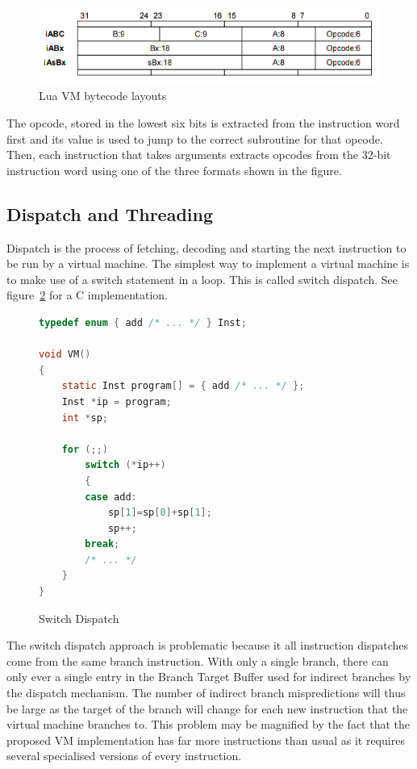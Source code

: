 \documentclass[english,a4paper,12pt]{report}
\begin{document}
\begin{figure}[!htb]
	\begin{center}
	    \includegraphics[scale=0.5]{luabytecode.png}
	\end{center}
 
  \caption[Lua VM bytecode layouts]{Lua VM bytecode layouts
    \protect\cite{RobertoIerusalimschy}}
  \label{fig:luabyte-repeat}
\end{figure}

The opcode, stored in the lowest six bits is extracted from the
instruction word first \cite{Lua.Source} and its value is used to jump
to the correct subroutine for that opcode. Then, each instruction that
takes arguments extracts opcodes from the 32-bit instruction word
using one of the three formats shown in the figure.

\subsection{Dispatch and Threading}
\label{sec:dispatch}
Dispatch is the process of fetching, decoding and starting the next
instruction to be run by a virtual machine. The simplest way to
implement a virtual machine is to make use of a switch statement in a
loop. This is called switch dispatch. See figure~\ref{fig:switch} for
a C implementation.

\begin{figure}[!htb]
  \begin{lstlisting}[language=C]
typedef enum { add /* ... */ } Inst; 

void VM() 
{ 
    static Inst program[] = { add /* ... */ }; 
    Inst *ip = program; 
    int *sp; 

    for (;;) 
        switch (*ip++) 
        { 
        case add: 
            sp[1]=sp[0]+sp[1]; 
            sp++; 
        break; 
        /* ... */ 
    }
} 
  \end{lstlisting}
  \caption[Switch Dispatch]{Switch Dispatch\cite{Ertl}}
  \label{fig:switch}
\end{figure}

The switch dispatch approach is problematic because it all instruction
dispatches come from the same branch instruction. With only a single
branch, there can only ever a single entry in the Branch Target Buffer
used for indirect branches by the dispatch mechanism. The number of
indirect branch mispredictions will thus be large as the target of the
branch will change for each new instruction that the virtual machine
branches to. This problem may be magnified by the fact that the
proposed VM implementation has far more instructions than usual as it
requires several specialised versions of every instruction.
\end{document}
